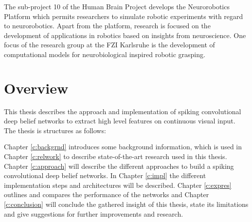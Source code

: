 The sub-project 10 of the Human Brain Project develops the Neurorobotics Platform which
permits researchers to simulate robotic experiments with regard to neurorobotics. Apart from the
platform, research is focused on the development of applications in robotics based on insights
from neuroscience. One focus of the research group at the FZI Karlsruhe is the development of
computational models for neurobiological inspired robotic grasping.


\section{Overview} \label{c:overw}

This thesis describes the approach and implementation of spiking convolutional deep belief networks to extract high level features on continuous visual input. The thesis is structures as follows:

Chapter \ref{c:backgrnd} introduces some background information, which is used in Chapter \ref{c:relwork} to describe state-of-the-art research used in this thesis. 
Chapter \ref{c:approach} will describe the different approaches to build a spiking convolutional deep belief networks. 
In Chapter \ref{c:impl} the different implementation steps and architectures will be described. 
Chapter \ref{c:expres} outlines and compares the performance of the networks and 
Chapter \ref{c:conclusion} will conclude the gathered insight of this thesis, state its limitations and give suggestions for further improvements and research.  